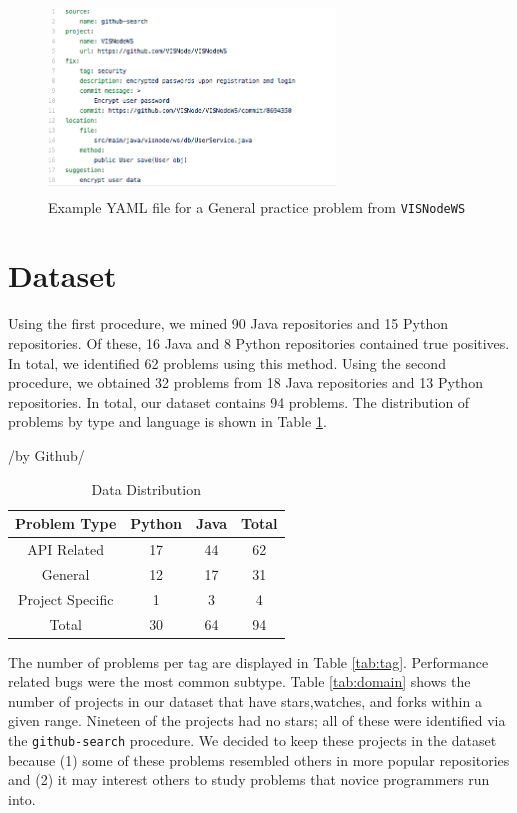 \documentclass[sigconf]{acmart}
\begin{document}
\begin{figure}
  \includegraphics[height=2in, width=3in]{YAMLmetadata2}
  \caption{Example YAML file for a General practice problem from \texttt{VISNodeWS}}
  \label{fig:meta2}
\end{figure}

\section{Dataset}

Using the first procedure, we mined 90 Java repositories and 15 Python repositories. Of these, 16 Java and 8 Python repositories contained true positives. In total, we identified 62  problems using this method. Using the second procedure, we obtained 32 problems from 18 Java repositories and 13 Python repositories. In total, our dataset contains 94 problems. The distribution of problems by type and language is shown in Table \ref{tab:type}.

\begin{table}/by Github/

  \caption{Data Distribution}
  \label{tab:type}
\begin{tabular}{ c c c c }
  \toprule
  Problem Type & Python & Java & Total \\
  \midrule
  API Related       &	17  &  44 &  62\\
  General    		&	12  &  17 &  31\\
  Project Specific  &	 1  &   3 &   4\\
  \midrule
  Total      		&	30  &  64 &  94\\
  \bottomrule
\end{tabular}
\end{table}

The number of problems per tag are displayed in Table \ref{tab:tag}. Performance related bugs were the most common subtype. Table \ref{tab:domain} shows the number of projects in our dataset that have stars,watches, and forks within a given range. Nineteen of the projects had no stars; all of these were identified via the \texttt{github-search} procedure. We decided to keep these projects in the dataset because (1) some of these problems resembled others in more popular repositories and (2) it may interest others to study problems that novice programmers run into.
\end{document}
